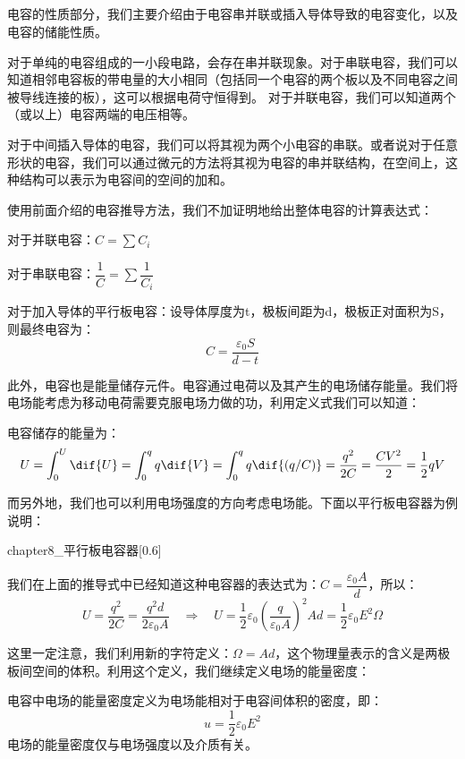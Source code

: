 \subsection[电容的性质]{}
电容的性质部分，我们主要介绍由于电容串并联或插入导体导致的电容变化，以及电容的储能性质。

对于单纯的电容组成的一小段电路，会存在串并联现象。对于串联电容，我们可以知道相邻电容板的带电量的大小相同（包括同一个电容的两个板以及不同电容之间被导线连接的板），这可以根据电荷守恒得到。
对于并联电容，我们可以知道两个（或以上）电容两端的电压相等。

对于中间插入导体的电容，我们可以将其视为两个小电容的串联。或者说对于任意形状的电容，我们可以通过微元的方法将其视为电容的串并联结构，在空间上，这种结构可以表示为电容间的空间的加和。

使用前面介绍的电容推导方法，我们不加证明地给出整体电容的计算表达式：
\begin{law}[电容的性质]
    对于并联电容：$C=\sum C_i$

    对于串联电容：$\dfrac{1}{C}=\sum\dfrac{1}{C_i}$

    对于加入导体的平行板电容：设导体厚度为t，极板间距为d，极板正对面积为S，则最终电容为：
    \[C=\dfrac{\varepsilon_0 S}{d-t}\]
\end{law}

此外，电容也是能量储存元件。电容通过电荷以及其产生的电场储存能量。我们将电场能考虑为移动电荷需要克服电场力做的功，利用定义式我们可以知道：
\begin{law}[电容的储能性质]
    电容储存的能量为：
    \[U=\int_0^U \dif{U}=\int_0^q q\dif{V}=\int_0^q q\dif{(q/C)}=\dfrac{q^2}{2C}=\dfrac{CV^2}{2}=\dfrac{1}{2}qV\]
\end{law}
而另外地，我们也可以利用电场强度的方向考虑电场能。下面以平行板电容器为例说明：
\begin{singlefigure}[平行板电容器]{chapter8_平行板电容器}[0.6]
\end{singlefigure}

我们在上面的推导式中已经知道这种电容器的表达式为：$C=\dfrac{\varepsilon_0 A}{d}$，所以：
\[U=\dfrac{q^2}{2C}=\dfrac{q^2 d}{2\varepsilon_0 A}\quad\Rightarrow\quad U=\dfrac{1}{2}\varepsilon_0 (\dfrac{q}{\varepsilon_0 A})^2 Ad=\dfrac{1}{2}\varepsilon_0 E^2\Omega\]

这里一定注意，我们利用新的字符定义：$\Omega =Ad$，这个物理量表示的含义是两极板间空间的体积。利用这个定义，我们继续定义电场的能量密度：
\begin{law}[电容中电场的能量密度]
    电容中电场的能量密度定义为电场能相对于电容间体积的密度，即：
    \[u=\dfrac{1}{2}\varepsilon_0 E^2\]
    电场的能量密度仅与电场强度以及介质有关。
\end{law}
